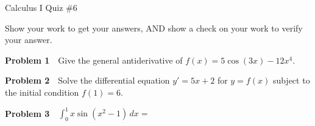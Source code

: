 \documentclass[10pt]{article}
\begin{document}


\begin{center}
Calculus I Quiz \#6
\end{center}



Show your work to get your answers, AND show a check on your work to verify your answer.

\vspace{5mm}

\noindent\textbf{Problem 1} \,\, Give the general antiderivative of $f(x) = 5 \cos(3x) - 12 x^4$.

\vspace{75mm}

\noindent\textbf{Problem 2} \,\, Solve the differential equation $y' = 5x + 2$ for $y = f(x)$ subject to the initial condition $f(1) = 6$.

\vspace{75mm}

\noindent\textbf{Problem 3} \,\, $\int_0^1 x \sin(x^2 - 1) \, dx = $
\end{document}
